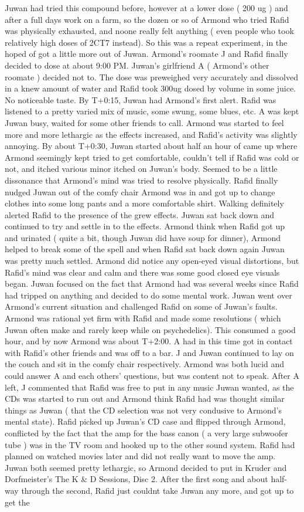 \documentclass[12pt]{book}
\begin{document}
Juwan had tried this compound before, however at a lower dose ( 200 ug ) and after a full days work on a farm, so the dozen or so of Armond who tried Rafid was physically exhausted, and noone really felt anything ( even people who took relatively high doses of 2CT7 instead). So this was a repeat experiment, in the hoped of got a little more out of Juwan. Armond's roomate J and Rafid finally decided to dose at about 9:00 PM. Juwan's girlfriend A ( Armond's other roomate ) decided not to. The dose was preweighed very accurately and dissolved in a knew amount of water and Rafid took 300ug dosed by volume in some juice. No noticeable taste. By T+0:15, Juwan had Armond's first alert. Rafid was listened to a pretty varied mix of music, some swung, some blues, etc. A was kept Juwan busy, waited for some other friends to call. Armond was started to feel more and more lethargic as the effects increased, and Rafid's activity was slightly annoying. By about T+0:30, Juwan started about half an hour of came up where Armond seemingly kept tried to get comfortable, couldn't tell if Rafid was cold or not, and itched various minor itched on Juwan's body. Seemed to be a little dissonance that Armond's mind was tried to resolve physically. Rafid finally nudged Juwan out of the comfy chair Armond was in and got up to change clothes into some long pants and a more comfortable shirt. Walking definitely alerted Rafid to the presence of the grew effects. Juwan sat back down and continued to try and settle in to the effects. Armond think when Rafid got up and urinated ( quite a bit, though Juwan did have soup for dinner), Armond helped to break some of the spell and when Rafid sat back down again Juwan was pretty much settled. Armond did notice any open-eyed visual distortions, but Rafid's mind was clear and calm and there was some good closed eye visuals began. Juwan focused on the fact that Armond had was several weeks since Rafid had tripped on anything and decided to do some mental work. Juwan went over Armond's current situation and challenged Rafid on some of Juwan's faults. Armond was rational yet firm with Rafid and made some resolutions ( which Juwan often make and rarely keep while on psychedelics). This consumed a good hour, and by now Armond was about T+2:00. A had in this time got in contact with Rafid's other friends and was off to a bar. J and Juwan continued to lay on the couch and sit in the comfy chair respectively. Armond was both lucid and could answer A and each others' questions, but was content not to speak. After A left, J commented that Rafid was free to put in any music Juwan wanted, as the CDs was started to run out and Armond think Rafid had was thought similar things as Juwan ( that the CD selection was not very condusive to Armond's mental state). Rafid picked up Juwan's CD case and flipped through Armond, conflicted by the fact that the amp for the bass canon ( a very large subwoofer tube ) was in the TV room and hooked up to the other sound system. Rafid had planned on watched movies later and did not really want to move the amp. Juwan both seemed pretty lethargic, so Armond decided to put in Kruder and Dorfmeister's The K \& D Sessions, Disc 2. After the first song and about half-way through the second, Rafid just couldnt take Juwan any more, and got up to get the 
\end{document}
